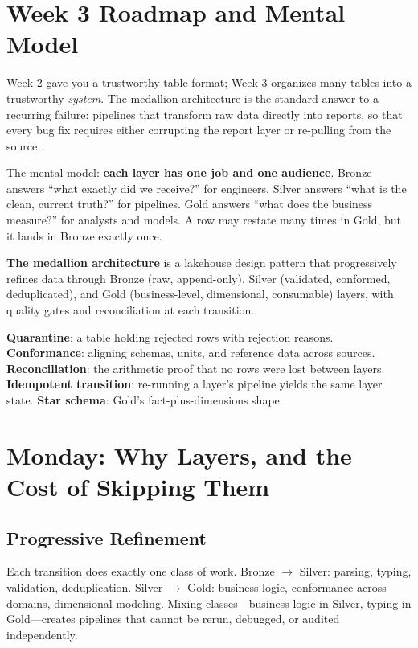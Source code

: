 \section{Week 3 Roadmap and Mental Model}
Week 2 gave you a trustworthy table format; Week 3 organizes many tables into a trustworthy \emph{system}. The medallion architecture is the standard answer to a recurring failure: pipelines that transform raw data directly into reports, so that every bug fix requires either corrupting the report layer or re-pulling from the source \cite{databricksMedallion}.

The mental model: \textbf{each layer has one job and one audience}. Bronze answers ``what exactly did we receive?'' for engineers. Silver answers ``what is the clean, current truth?'' for pipelines. Gold answers ``what does the business measure?'' for analysts and models. A row may restate many times in Gold, but it lands in Bronze exactly once.

\begin{definitionbox}
\textbf{The medallion architecture} is a lakehouse design pattern that progressively refines data through Bronze (raw, append-only), Silver (validated, conformed, deduplicated), and Gold (business-level, dimensional, consumable) layers, with quality gates and reconciliation at each transition.
\end{definitionbox}

\begin{keyterms}
\textbf{Quarantine}: a table holding rejected rows with rejection reasons. \textbf{Conformance}: aligning schemas, units, and reference data across sources. \textbf{Reconciliation}: the arithmetic proof that no rows were lost between layers. \textbf{Idempotent transition}: re-running a layer's pipeline yields the same layer state. \textbf{Star schema}: Gold's fact-plus-dimensions shape.
\end{keyterms}

\section{Monday: Why Layers, and the Cost of Skipping Them}
\subsection{Progressive Refinement}
Each transition does exactly one class of work. Bronze $\rightarrow$ Silver: parsing, typing, validation, deduplication. Silver $\rightarrow$ Gold: business logic, conformance across domains, dimensional modeling. Mixing classes---business logic in Silver, typing in Gold---creates pipelines that cannot be rerun, debugged, or audited independently.

